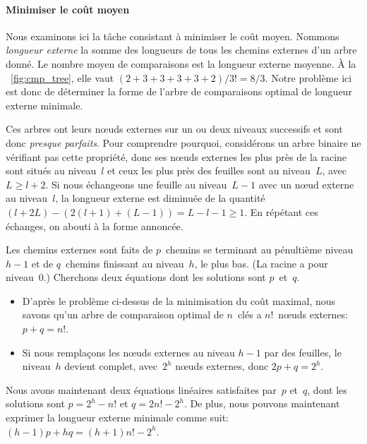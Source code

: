 \paragraph{Minimiser le coût moyen}
\label{par:opt_sort_minimean}

Nous examinons ici la tâche consistant à minimiser le coût
moyen. Nommons \emph{longueur
  externe}\label{sorting__external_path_length}  la somme des longueurs de tous les chemins
externes d'un arbre donné. Le nombre moyen de comparaisons est la
longueur externe moyenne. À la \fig~\vref{fig:cmp_tree}, elle vaut
\((2+3+3+3+3+2)/3!=8/3\). Notre problème ici est donc de déterminer la
forme de l'arbre de comparaisons optimal de longueur externe minimale.

Ces arbres ont leurs nœuds externes sur un ou deux niveaux
successifs et sont donc \emph{presque parfaits}. Pour comprendre pourquoi,
considérons un arbre binaire ne vérifiant pas cette propriété, donc
ses nœuds externes les plus près de la racine sont situés au
niveau~\(l\) et ceux les plus près des feuilles sont au niveau~\(L\),
avec \(L \geqslant l + 2\). Si nous échangeons une feuille au
niveau~\(L-1\) avec un nœud externe au niveau~\(l\), la longueur
externe est diminuée de la quantité \((l+2L) - (2(l+1) + (L-1)) = L -
l - 1 \geqslant 1\). En répétant ces échanges, on abouti à la forme
annoncée.

Les chemins externes sont faits de \(p\)~chemins se terminant au
pénultième niveau~\(h-1\) et de \(q\)~chemins finissant au
niveau~\(h\), le plus bas. (La racine a pour niveau~\(0\).) Cherchons
deux équations dont les solutions sont \(p\)~et~\(q\).
\begin{itemize}

  \item D'après le problème ci-dessus de la minimisation du coût
    maximal, nous savons qu'un arbre de comparaison optimal de
    \(n\)~clés a \(n!\)~nœuds externes: \(p+q=n!\).

  \item Si nous remplaçons les nœuds externes au niveau \(h-1\)
    par des feuilles, le niveau~\(h\) devient complet, avec~\(2^h\)
    nœuds externes, donc \(2p+q=2^h\).

\end{itemize}
Nous avons maintenant deux équations linéaires satisfaites par~\(p\)
et~\(q\), dont les solutions sont \(p=2^h-n!\) et \(q=2n!-2^h\). De
plus, nous pouvons maintenant exprimer la longueur externe minimale
comme suit: \((h-1)p + hq = (h+1)n! - 2^h\).

